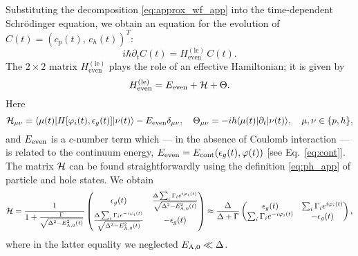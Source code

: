 \documentclass[aps,reprint,longbibliography, prb]{revtex4-2}
\begin{document}
Substituting the decomposition \eqref{eq:approx_wf_app} into the time-dependent Schr\"odinger equation, we obtain an equation for the evolution of $C(t) = (c_p(t),\,c_h(t))^T$:
\begin{equation}
    i\hbar\partial_t C(t) = H_\mathrm{even}^{\mathrm{(le)}}\,C(t).
\end{equation}
The $2\times 2$ matrix $H_\mathrm{even}^{\mathrm{(le)}}$ plays the role of an effective Hamiltonian; it is given by
\begin{equation}\label{eq:le-ham_gen_app}
    H_\mathrm{even}^{\mathrm{(le)}} = E_{\rm even} + {\cal H} + \Theta.
\end{equation}
Here
\begin{equation}
    {\cal H}_{\mu\nu} = \langle \mu(t) | H[\varphi_i(t), \epsilon_g(t)] |\nu(t) \rangle - E_{\rm even}\delta_{\mu\nu}, \quad \Theta_{\mu\nu} = -i\hbar \langle \mu(t) | {\partial_t}| \nu(t)\rangle,\quad \mu,\nu \in \{ p, h \},
\end{equation}
and $E_{\rm even}$ is a $c$-number term which --- in the absence of Coulomb interaction --- is related to the continuum energy, $E_{\rm even} = E_{\rm cont}(\epsilon_g(t),\varphi(t))$ [see Eq.~\eqref{eq:cont}].
The matrix ${\cal H}$ can be found straightforwardly using the definition \eqref{eq:ph_app} of particle and hole states. We obtain
\begin{equation}\label{eq:H_app}
    {\cal H} = \frac{1}{1 + \frac{\Gamma}{\sqrt{\Delta^2 - E_\mathrm{A,0}^2(t)}}}
    \begin{pmatrix}
    \epsilon_g(t) & \frac{\Delta \sum_i\Gamma_i e^{i\varphi_i(t)}}{\sqrt{\Delta^2 - E_\mathrm{A,0}^2(t)}} \\
    \frac{\Delta \sum_i\Gamma_i e^{-i\varphi_i(t)}}{\sqrt{\Delta^2 - E_\mathrm{A,0}^2(t)}}  & -\epsilon_g(t)
    \end{pmatrix} \approx \frac{\Delta}{\Delta + \Gamma}
    \begin{pmatrix}
    \epsilon_g(t) & \sum_i\Gamma_i e^{i\varphi_i(t)}\\
    \sum_i\Gamma_i e^{-i\varphi_i (t)} & -\epsilon_g(t)
    \end{pmatrix},
\end{equation}
where in the latter equality we neglected $E_{\rm A,0} \ll \Delta$.
\end{document}
